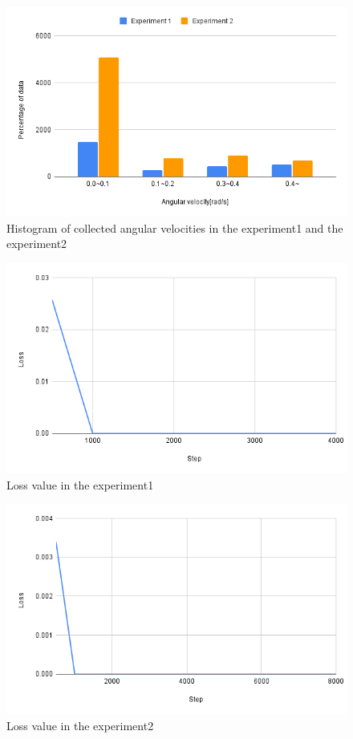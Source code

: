 \newpage
\begin{figure}[h]
  \centering
  \includegraphics[keepaspectratio, scale=0.5]{images/ang_sum.png}
  \caption{Histogram of collected angular velocities in the experiment1 and the experiment2}
  \label{Fig:hist}
  \end{figure}

\newpage
\begin{figure}[h]
  \centering
  \includegraphics[keepaspectratio, scale=0.31]{images/exp2_4000.png}
  \caption{Loss value in the experiment1}
  \label{Fig:exp2.1-4000}
  \end{figure}

\begin{figure}[h]
  \centering
  \includegraphics[keepaspectratio, scale=0.31]{images/exp2_8000.png}
  \caption{Loss value in the experiment2}
  \label{Fig:exp2.1-8000}
  \end{figure}

